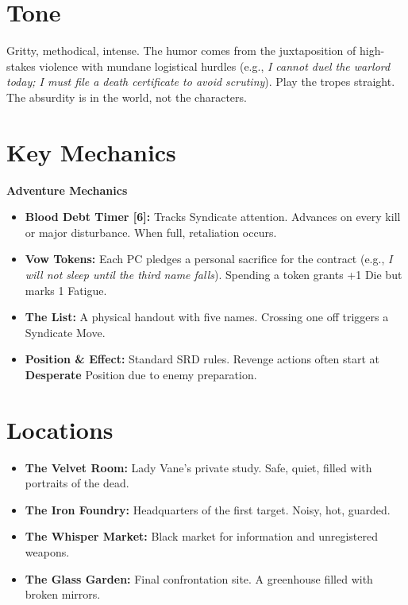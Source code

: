 \documentclass[12pt]{book}
\begin{document}
\section{Tone}

Gritty, methodical, intense. The humor comes from the juxtaposition of high-stakes violence with mundane logistical hurdles (e.g., \textit{I cannot duel the warlord today; I must file a death certificate to avoid scrutiny}). Play the tropes straight. The absurdity is in the world, not the characters.

\section{Key Mechanics}

\begin{infobox}
\textbf{Adventure Mechanics}
\begin{itemize}
    \item \textbf{Blood Debt Timer [6]:} Tracks Syndicate attention. Advances on every kill or major disturbance. When full, retaliation occurs.
    \item \textbf{Vow Tokens:} Each PC pledges a personal sacrifice for the contract (e.g., \textit{I will not sleep until the third name falls}). Spending a token grants +1 Die but marks 1 Fatigue.
    \item \textbf{The List:} A physical handout with five names. Crossing one off triggers a Syndicate Move.
    \item \textbf{Position \& Effect:} Standard SRD rules. Revenge actions often start at \textbf{Desperate} Position due to enemy preparation.
\end{itemize}
\end{infobox}

\section{Locations}

\begin{itemize}
    \item \textbf{The Velvet Room:} Lady Vane's private study. Safe, quiet, filled with portraits of the dead.
    \item \textbf{The Iron Foundry:} Headquarters of the first target. Noisy, hot, guarded.
    \item \textbf{The Whisper Market:} Black market for information and unregistered weapons.
    \item \textbf{The Glass Garden:} Final confrontation site. A greenhouse filled with broken mirrors.
\end{itemize}
\end{document}
